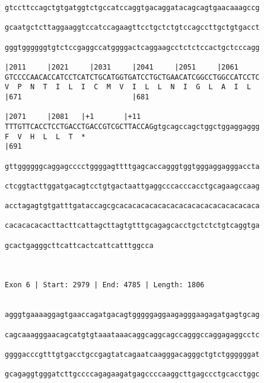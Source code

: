 \documentclass{article}
\begin{document}
\begin{Verbatim}
gtccttccagctgtgatggtctgccatccaggtgacaggatacagcagtgaacaaagccg
                                                            
gcaatgctcttaggaaggtccatccagaagttcctgctctgtccagccttgctgtgacct
                                                            
gggtggggggtgtctccgaggccatggggactcaggaagcctctctccactgctcccagg
                                                            
|2011     |2021     |2031     |2041     |2051     |2061     
GTCCCCAACACCATCCTCATCTGCATGGTGATCCTGCTGAACATCGGCCTGGCCATCCTC
V  P  N  T  I  L  I  C  M  V  I  L  L  N  I  G  L  A  I  L  
|671                          |681                          
  
|2071     |2081   |+1       |+11                            
TTTGTTCACCTCCTGACCTGACCGTCGCTTACCAGgtgcagccagctggctggaggaggg
F  V  H  L  L  T  *                                         
|691                                                        
  
gttggggggcaggagcccctggggagttttgagcaccagggtggtgggaggagggaccta
                                                            
ctcggtacttggatgacagtcctgtgactaattgaggcccacccacctgcagaagccaag
                                                            
acctagagtgtgatttgataccagcgcacacacacacacacacacacacacacacacaca
                                                            
cacacacacacttacttcattagcttagtgtttgcagagcacctgctctctgtcaggtga
                                                            
gcactgagggcttcattcactcattcatttggcca
                                   
                                   
 
Exon 6 | Start: 2979 | End: 4785 | Length: 1806


agggtgaaaaggagtgaaccagatgacagtgggggaggaagagggaagagatgagtgcag
                                                            
cagcaaagggaacagcatgtgtaaataaacaggcaggcagccagggccaggagaggcctc
                                                            
ggggacccgtttgtgacctgccgagtatcagaatcaagggacagggctgtctggggggat
                                                            
gcagaggtgggatcttgccccagagaagatgagccccaaggcttgagccctgcacctggc
                                                            

\end{Verbatim}
\end{document}

